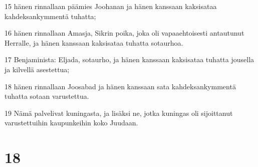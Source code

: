 \par 15 hänen rinnallaan päämies Joohanan ja hänen kanssaan kaksisataa kahdeksankymmentä tuhatta;
\par 16 hänen rinnallaan Amasja, Sikrin poika, joka oli vapaaehtoisesti antautunut Herralle, ja hänen kanssaan kaksisataa tuhatta sotaurhoa.
\par 17 Benjaminista: Eljada, sotaurho, ja hänen kanssaan kaksisataa tuhatta jousella ja kilvellä asestettua;
\par 18 hänen rinnallaan Joosabad ja hänen kanssaan sata kahdeksankymmentä tuhatta sotaan varustettua.
\par 19 Nämä palvelivat kuningasta, ja lisäksi ne, jotka kuningas oli sijoittanut varustettuihin kaupunkeihin koko Juudaan.

\chapter{18}

